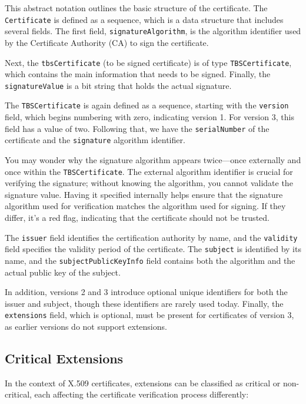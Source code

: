 This abstract notation outlines the basic structure of the
certificate. The \texttt{Certificate} is defined as a sequence, which
is a data structure that includes several fields. The first field,
\texttt{signatureAlgorithm}, is the algorithm identifier used by the
Certificate Authority (CA) to sign the certificate. 

Next, the \texttt{tbsCertificate} (to be signed certificate) is of
type \texttt{TBSCertificate}, which contains the main information that
needs to be signed. Finally, the \texttt{signatureValue} is a bit
string that holds the actual signature.

The \texttt{TBSCertificate} is again defined as a sequence, starting
with the \texttt{version} field, which begins numbering with zero,
indicating version 1. For version 3, this field has a value of two.
Following that, we have the \texttt{serialNumber} of the certificate
and the \texttt{signature} algorithm identifier. 

You may wonder why the signature algorithm appears twice—once
externally and once within the \texttt{TBSCertificate}. The external
algorithm identifier is crucial for verifying the signature; without
knowing the algorithm, you cannot validate the signature value. Having
it specified internally helps ensure that the signature algorithm used
for verification matches the algorithm used for signing. If they
differ, it's a red flag, indicating that the certificate should not be
trusted.

The \texttt{issuer} field identifies the certification authority by
name, and the \texttt{validity} field specifies the validity period of
the certificate. The \texttt{subject} is identified by its name, and
the \texttt{subjectPublicKeyInfo} field contains both the algorithm
and the actual public key of the subject.

In addition, versions 2 and 3 introduce optional unique identifiers
for both the issuer and subject, though these identifiers are rarely
used today. Finally, the \texttt{extensions} field, which is optional,
must be present for certificates of version 3, as earlier versions do
not support extensions.


\subsection{Critical Extensions}

In the context of X.509 certificates, extensions can be classified as
critical or non-critical, each affecting the certificate verification
process differently:

